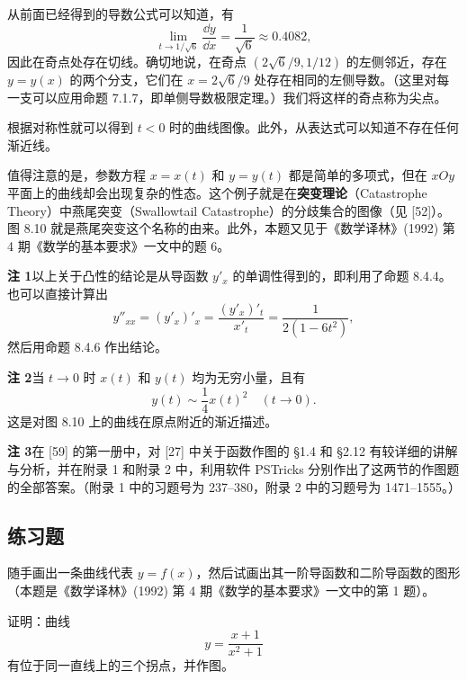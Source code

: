 \begin{xsolution}
从前面已经得到的导数公式可以知道，有
\[
  \lim_{t\to1/\sqrt6}\frac{\dd y}{\dd x}=\frac1{\sqrt6}\approx0.4082,
\]
因此在奇点处存在切线。确切地说，在奇点 $(2\sqrt6/9,1/12)$ 的左侧邻近，存在 $y=y(x)$ 的两个分支，它们在 $x=2\sqrt6/9$ 处存在相同的左侧导数。（这里对每一支可以应用命题 7.1.7，即单侧导数极限定理。）我们将这样的奇点称为尖点。

根据对称性就可以得到 $t<0$ 时的曲线图像。此外，从表达式可以知道不存在任何渐近线。

值得注意的是，参数方程 $x=x(t)$ 和 $y=y(t)$ 都是简单的多项式，但在 $xOy$ 平面上的曲线却会出现复杂的性态。这个例子就是在\textbf{突变理论}（Catastrophe Theory）中燕尾突变（Swallowtail Catastrophe）的分歧集合的图像（见 [52]）。图 8.10 就是燕尾突变这个名称的由来。此外，本题又见于《数学译林》(1992) 第 4 期《数学的基本要求》一文中的题 6。

\begin{xremark}
\textbf{注 1}\quad 以上关于凸性的结论是从导函数 $y'_x$ 的单调性得到的，即利用了命题 8.4.4。也可以直接计算出
\[
  y''_{xx}=(y'_x)'_x=\frac{(y'_x)'_t}{x'_t}
  =\frac1{2(1-6t^2)},
\]
然后用命题 8.4.6 作出结论。

\textbf{注 2}\quad 当 $t\to0$ 时 $x(t)$ 和 $y(t)$ 均为无穷小量，且有
\[
  y(t)\sim\frac14x(t)^2\quad(t\to0).
\]
这是对图 8.10 上的曲线在原点附近的渐近描述。

\textbf{注 3}\quad 在 [59] 的第一册中，对 [27] 中关于函数作图的 §1.4 和 §2.12 有较详细的讲解与分析，并在附录 1 和附录 2 中，利用软件 PSTricks 分别作出了这两节的作图题的全部答案。（附录 1 中的习题号为 237--380，附录 2 中的习题号为 1471--1555。）
\end{xremark}
\end{xsolution}

\subsection{练习题}

\begin{xexercise}[1]
随手画出一条曲线代表 $y=f(x)$，然后试画出其一阶导函数和二阶导函数的图形（本题是《数学译林》(1992) 第 4 期《数学的基本要求》一文中的第 1 题）。
\end{xexercise}

\begin{xexercise}[2]
证明：曲线
  \[
    y=\frac{x+1}{x^2+1}
  \]
  有位于同一直线上的三个拐点，并作图。
\end{xexercise}

